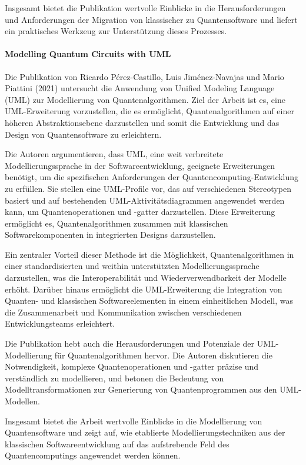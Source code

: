 Insgesamt bietet die Publikation wertvolle Einblicke in die Herausforderungen und Anforderungen der Migration 
von klassischer zu Quantensoftware und liefert ein praktisches Werkzeug zur Unterstützung dieses Prozesses.

\paragraph{Modelling Quantum Circuits with UML}

Die Publikation von Ricardo Pérez-Castillo, Luis Jiménez-Navajas und Mario Piattini (2021) untersucht die Anwendung 
von Unified Modeling Language (UML) zur Modellierung von Quantenalgorithmen. Ziel der Arbeit ist es, eine 
UML-Erweiterung vorzustellen, die es ermöglicht, Quantenalgorithmen auf einer höheren Abstraktionsebene 
darzustellen und somit die Entwicklung und das Design von Quantensoftware zu erleichtern.

Die Autoren argumentieren, dass UML, eine weit verbreitete Modellierungssprache in der Softwareentwicklung, 
geeignete Erweiterungen benötigt, um die spezifischen Anforderungen der Quantencomputing-Entwicklung zu erfüllen. 
Sie stellen eine UML-Profile vor, das auf verschiedenen Stereotypen basiert und auf bestehenden UML-Aktivitätsdiagrammen 
angewendet werden kann, um Quantenoperationen und -gatter darzustellen. Diese Erweiterung ermöglicht es, 
Quantenalgorithmen zusammen mit klassischen Softwarekomponenten in integrierten Designs darzustellen.

Ein zentraler Vorteil dieser Methode ist die Möglichkeit, Quantenalgorithmen in einer standardisierten und 
weithin unterstützten Modellierungssprache darzustellen, was die Interoperabilität und Wiederverwendbarkeit 
der Modelle erhöht. Darüber hinaus ermöglicht die UML-Erweiterung die Integration von Quanten- und klassischen 
Softwareelementen in einem einheitlichen Modell, was die Zusammenarbeit und Kommunikation zwischen verschiedenen 
Entwicklungsteams erleichtert.

Die Publikation hebt auch die Herausforderungen und Potenziale der UML-Modellierung für Quantenalgorithmen hervor. 
Die Autoren diskutieren die Notwendigkeit, komplexe Quantenoperationen und -gatter präzise und verständlich zu 
modellieren, und betonen die Bedeutung von Modelltransformationen zur Generierung von Quantenprogrammen aus den UML-Modellen.

Insgesamt bietet die Arbeit wertvolle Einblicke in die Modellierung von Quantensoftware und zeigt auf, wie 
etablierte Modellierungstechniken aus der klassischen Softwareentwicklung auf das aufstrebende Feld des 
Quantencomputings angewendet werden können.

